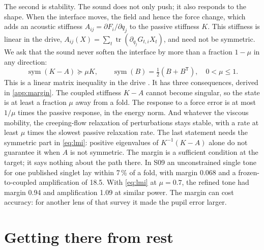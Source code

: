 \documentclass[11pt,a4paper]{article}
\numberwithin{equation}{section}
\DeclareMathOperator{\tr}{tr}
\DeclareMathOperator{\sym}{sym}
\begin{document}
The second is stability. The sound does not only push; it also responds to
the shape. When the interface moves, the field and hence the force change, which
adds an acoustic stiffness $A_{ij}=\partial F_i/\partial q_j$ to the passive
stiffness $K$. This stiffness is linear in the drive,
$A_{ij}(X)=\sum_t\tr(\partial_{q_j}G_{t,i}X_t)$, and need not be symmetric. We
ask that the sound never soften the interface by more than a fraction $1-\mu$ in
any direction:
\begin{equation}
 \sym(K-A)\succeq\mu K,\qquad \sym(B)=\tfrac12(B+B^{\mathsf T}),\quad 0<\mu\le1 .
 \label{eq:lmi}
\end{equation}
This is a linear matrix inequality in the drive \cite{boyd1994}. It has three
consequences, derived in \cref{app:margin}. The coupled stiffness $K-A$ cannot
become singular, so the state is at least a fraction $\mu$ away from a fold.
The response to a force error is at most $1/\mu$ times the passive response, in
the energy norm. And whatever the viscous mobility, the creeping-flow relaxation
of perturbations stays stable, with a rate at least $\mu$ times the slowest
passive relaxation rate. The last statement needs the symmetric part in
\cref{eq:lmi}: positive eigenvalues of $K^{-1}(K-A)$ alone do not guarantee it
when $A$ is not symmetric. The margin is a sufficient condition at the target;
it says nothing about the path there. In S09 an unconstrained single tone for
one published singlet lay within 7\,\% of a fold, with margin 0.068 and a
frozen-to-coupled amplification of 18.5. With \cref{eq:lmi} at $\mu=0.7$, the
refined tone had margin 0.94 and amplification 1.09 at similar power. The margin
can cost accuracy: for another lens of that survey it made the pupil error
larger.

\section{Getting there from rest}\label{sec:formation}
\end{document}
